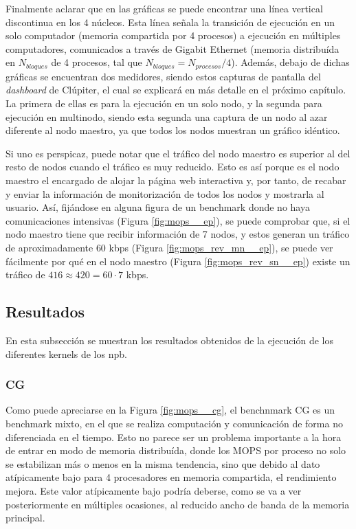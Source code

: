 Finalmente aclarar que en las gráficas se puede encontrar una línea vertical discontinua en los 4 núcleos. Esta línea señala la transición de ejecución en un solo computador (memoria compartida por 4 procesos) a ejecución en múltiples computadores, comunicados a través de Gigabit Ethernet (memoria distribuída en $N_{bloques}$ de 4 procesos, tal que $N_{bloques} = N_{procesos} / 4$). Además, debajo de dichas gráficas se encuentran dos medidores, siendo estos capturas de pantalla del \textit{dashboard} de Clúpiter, el cual se explicará en más detalle en el próximo capítulo. La primera de ellas es para la ejecución en un solo nodo, y la segunda para ejecución en multinodo, siendo esta segunda una captura de un nodo al azar diferente al nodo maestro, ya que todos los nodos muestran un gráfico idéntico.

Si uno es perspicaz, puede notar que el tráfico del nodo maestro es superior al del resto de nodos cuando el tráfico es muy reducido. Esto es así porque es el nodo maestro el encargado de alojar la página web interactiva y, por tanto, de recabar y enviar la información de monitorización de todos los nodos y mostrarla al usuario. Así, fijándose en alguna figura de un benchmark donde no haya comunicaciones intensivas (Figura \ref{fig:mops__ep}), se puede comprobar que, si el nodo maestro tiene que recibir información de 7 nodos, y estos generan un tráfico de aproximadamente $60$ kbps (Figura \ref{fig:mops_rev_mn__ep}), se puede ver fácilmente por qué en el nodo maestro (Figura \ref{fig:mops_rev_sn__ep}) existe un tráfico de $416 \approx 420 = 60 \cdot 7$ kbps.

\subsection{Resultados}
\label{ssec:resultados}
En esta subsección se muestran los resultados obtenidos de la ejecución de los diferentes kernels de los \acrlong{npb}.

\subsubsection{CG}
\label{sssec:resultados__cg}
Como puede apreciarse en la Figura \ref{fig:mops__cg}, el benchnmark CG es un benchmark mixto, en el que se realiza computación y comunicación de forma no diferenciada en el tiempo. Esto no parece ser un problema importante a la hora de entrar en modo de memoria distribuída, donde los MOPS por proceso no solo se estabilizan más o menos en la misma tendencia, sino que debido al dato atípicamente bajo para 4 procesadores en memoria compartida, el rendimiento mejora. Este valor atípicamente bajo podría deberse, como se va a ver posteriormente en múltiples ocasiones, al reducido ancho de banda de la memoria principal.

